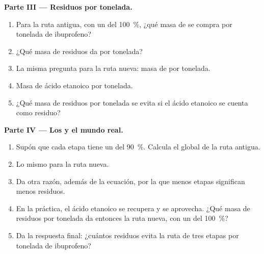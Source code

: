 \begin{problem}
\medskip
\noindent\textbf{Parte III --- Residuos por tonelada.}
\begin{enumerate}[resume]
  \item Para la ruta antigua, con un  del \qty{100}{\percent},
        ¿qué masa de  se compra por tonelada de ibuprofeno?
  \item ¿Qué masa de residuos da por tonelada?
  \item La misma pregunta para la ruta nueva: masa de  por
        tonelada.
  \item Masa de ácido etanoico por tonelada.
  \item ¿Qué masa de residuos por tonelada se evita si el ácido etanoico
        se cuenta como residuo?
\end{enumerate}

\medskip
\noindent\textbf{Parte IV --- Los  y el mundo real.}
\begin{enumerate}[resume]
  \item Supón que cada etapa tiene un  del \qty{90}{\percent}.
        Calcula el  global de la ruta antigua.
  \item Lo mismo para la ruta nueva.
  \item Da otra razón, además de la ecuación, por la que menos etapas
        significan menos residuos.
  \item En la práctica, el ácido etanoico se recupera y se aprovecha. ¿Qué
        masa de residuos por tonelada da entonces la ruta nueva, con un
         del \qty{100}{\percent}?
  \item Da la respuesta final: ¿cuántos residuos evita la ruta de tres
        etapas por tonelada de ibuprofeno?
\end{enumerate}
\end{problem}
